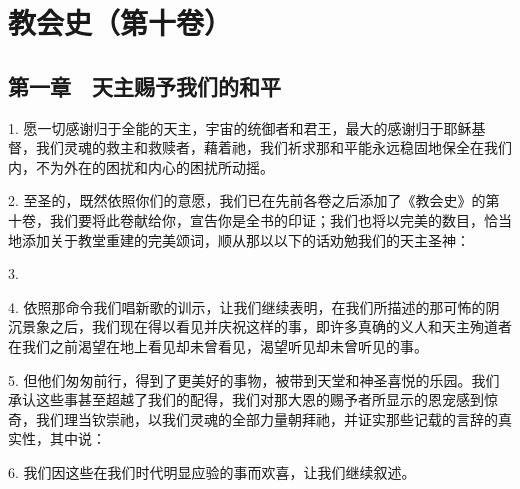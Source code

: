 

\section{教会史（第十卷）}


\subsection{第一章　天主赐予我们的和平}

1. 愿一切感谢归于全能的天主，宇宙的统御者和君王，最大的感谢归于耶稣基督，我们灵魂的救主和救赎者，藉着祂，我们祈求那和平能永远稳固地保全在我们内，不为外在的困扰和内心的困扰所动摇。\par

2. 至圣的，既然依照你们的意愿，我们已在先前各卷之后添加了《教会史》的第十卷，我们要将此卷献给你，宣告你是全书的印证；我们也将以完美的数目，恰当地添加关于教堂重建的完美颂词，顺从那以以下的话劝勉我们的天主圣神：\par

3. \par

4. 依照那命令我们唱新歌的训示，让我们继续表明，在我们所描述的那可怖的阴沉景象之后，我们现在得以看见并庆祝这样的事，即许多真确的义人和天主殉道者在我们之前渴望在地上看见却未曾看见，渴望听见却未曾听见的事。\par

5. 但他们匆匆前行，得到了更美好的事物，被带到天堂和神圣喜悦的乐园。我们承认这些事甚至超越了我们的配得，我们对那大恩的赐予者所显示的恩宠感到惊奇，我们理当钦崇祂，以我们灵魂的全部力量朝拜祂，并证实那些记载的言辞的真实性，其中说：\par

6. 我们因这些在我们时代明显应验的事而欢喜，让我们继续叙述。\par


